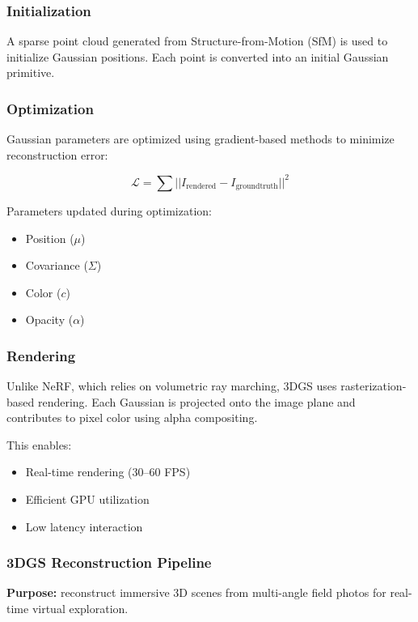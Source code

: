 \subsubsection*{Initialization}

A sparse point cloud generated from Structure-from-Motion (SfM) is used to initialize Gaussian positions. Each point is converted into an initial Gaussian primitive.

\subsubsection*{Optimization}

Gaussian parameters are optimized using gradient-based methods to minimize reconstruction error:

\[
\mathcal{L} = \sum || I_{\text{rendered}} - I_{\text{groundtruth}} ||^2
\]

Parameters updated during optimization:
\begin{itemize}
    \item Position ($\mu$)
    \item Covariance ($\Sigma$)
    \item Color ($c$)
    \item Opacity ($\alpha$)
\end{itemize}

\subsubsection*{Rendering}

Unlike NeRF, which relies on volumetric ray marching, 3DGS uses rasterization-based rendering. Each Gaussian is projected onto the image plane and contributes to pixel color using alpha compositing.

This enables:
\begin{itemize}
    \item Real-time rendering (30–60 FPS)
    \item Efficient GPU utilization
    \item Low latency interaction
\end{itemize}


\subsubsection{3DGS Reconstruction Pipeline}
\textbf{Purpose:} reconstruct immersive 3D scenes from multi-angle field photos for real-time virtual exploration.

